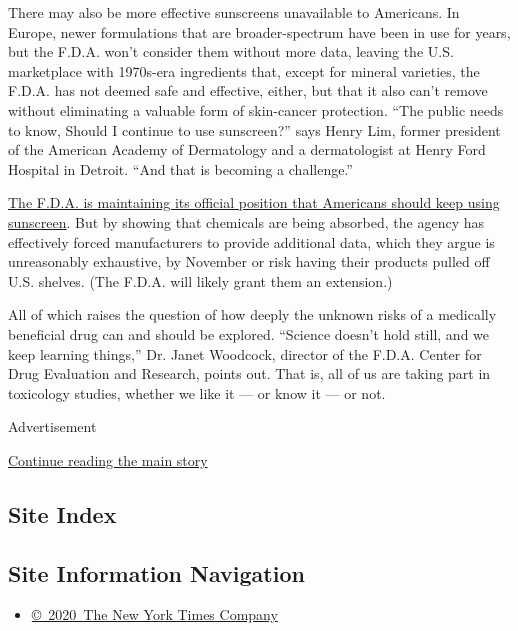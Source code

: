 There may also be more effective sunscreens unavailable to Americans. In
Europe, newer formulations that are broader-spectrum have been in use
for years, but the F.D.A. won't consider them without more data, leaving
the U.S. marketplace with 1970s-era ingredients that, except for mineral
varieties, the F.D.A. has not deemed safe and effective, either, but
that it also can't remove without eliminating a valuable form of
skin-cancer protection. ``The public needs to know, Should I continue to
use sunscreen?'' says Henry Lim, former president of the American
Academy of Dermatology and a dermatologist at Henry Ford Hospital in
Detroit. ``And that is becoming a challenge.''

\href{https://www.fda.gov/drugs/understanding-over-counter-medicines/sunscreen-how-help-protect-your-skin-sun}{The
F.D.A. is maintaining its official position that Americans should keep
using sunscreen}. But by showing that chemicals are being absorbed, the
agency has effectively forced manufacturers to provide additional data,
which they argue is unreasonably exhaustive, by November or risk having
their products pulled off U.S. shelves. (The F.D.A. will likely grant
them an extension.)

All of which raises the question of how deeply the unknown risks of a
medically beneficial drug can and should be explored. ``Science doesn't
hold still, and we keep learning things,'' Dr. Janet Woodcock, director
of the F.D.A. Center for Drug Evaluation and Research, points out. That
is, all of us are taking part in toxicology studies, whether we like it
--- or know it --- or not.

Advertisement

\protect\hyperlink{after-bottom}{Continue reading the main story}

\hypertarget{site-index}{%
\subsection{Site Index}\label{site-index}}

\hypertarget{site-information-navigation}{%
\subsection{Site Information
Navigation}\label{site-information-navigation}}

\begin{itemize}
\tightlist
\item
  \href{https://help.nytimes3xbfgragh.onion/hc/en-us/articles/115014792127-Copyright-notice}{©~2020~The
  New York Times Company}
\end{itemize}

